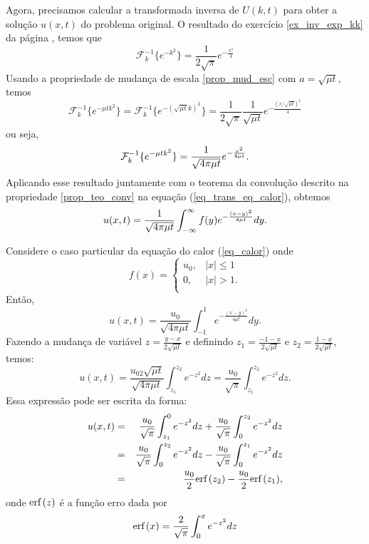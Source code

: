 Agora, precisamos calcular a transformada inversa de $U(k,t)$ para obter a solução $u(x,t)$ do problema original. O resultado do exercício \ref{ex_inv_exp_kk} da página \pageref{ex_inv_exp_kk}, temos que
\begin{equation}
\mathcal{F}^{-1}_k\{e^{-k^2}\}=\frac{1}{2\sqrt{\pi}} e^{-\frac{x^2}{4}}
\end{equation}
Usando a propriedade de mudança de escala \ref{prop_mud_esc} com $a=\sqrt{\mu t}$, temos
\begin{equation}
\mathcal{F}_k^{-1}\{e^{-\mu t k^2}\}=\mathcal{F}_k^{-1}\{e^{-(\sqrt{\mu t} k)^2}\}=\frac{1}{2\sqrt{\pi}}\frac{1}{\sqrt{\mu t}} e^{-\frac{\left(x/\sqrt{\mu t}\right)^2}{4}}
\end{equation}
ou seja,
\begin{equation}{\label{eq_calor_02}}
\mathcal{F}_k^{-1}\{e^{-\mu t k^2}\}=\frac{1}{\sqrt{4\pi\mu t}} e^{-\frac{x^2}{4\mu t}}.
\end{equation}
Aplicando esse resultado juntamente com o teorema da convolução descrito na propriedade \ref{prop_teo_conv} na equação (\ref{eq_trans_eq_calor}), obtemos
\begin{equation}{\label{eq_dif_calor}}
u(x,t)=\frac{1}{\sqrt{4\pi \mu t}}\int_{-\infty}^\infty
f(y)e^{-\frac{(x-y)^2}{4\mu t}}dy.
\end{equation}
\begin{ex}Considere o caso particular da equação do calor (\ref{eq_calor}) onde
\begin{equation}
f(x)=\left\{\begin{array}{ll}
u_0,& |x|\leq 1\\
0,& |x|>1.\\
\end{array}\right.
\end{equation}
Então,
\begin{equation*}
u(x,t)=\frac{u_0}{\sqrt{4\pi \mu t}}\int_{-1}^1
e^{-\frac{(x-y)^2}{4\mu t}}dy.
\end{equation*}
Fazendo a mudança de variável $z=\frac{y-x}{2\sqrt{\mu t}}$ e definindo $z_1=\frac{-1-x}{2\sqrt{\mu t}}$ e $z_2=\frac{1-x}{2\sqrt{\mu t}}$, temos:
\begin{equation*}
u(x,t)=\frac{u_02\sqrt{\mu t}}{\sqrt{4\pi \mu t}}\int_{z_1}^{z_2}
e^{-z^2}dz=\frac{u_0}{\sqrt{\pi }}\int_{z_1}^{z_2}
e^{-z^2}dz.
\end{equation*}
Essa expressão pode ser escrita da forma:
\begin{eqnarray*}
u(x,t)&=&\frac{u_0}{\sqrt{\pi }}\int_{z_1}^{0}
e^{-z^2}dz+\frac{u_0}{\sqrt{\pi }}\int_{0}^{z_2}
e^{-z^2}dz\\
&=&\frac{u_0}{\sqrt{\pi }}\int_{0}^{z_2}
e^{-z^2}dz-\frac{u_0}{\sqrt{\pi }}\int_{0}^{z_1}
e^{-z^2}dz\\
&=&\frac{u_0}{2}\hbox{erf}\ \!(z_2)-\frac{u_0}{2}\hbox{erf}\ \!(z_1),
\end{eqnarray*}
onde $\hbox{erf}\ \!(z)$ é a função erro dada por
\begin{equation}
\hbox{erf}\ \!(x)=\frac{2}{\sqrt{\pi }}\int_{0}^{x}
e^{-z^2}dz
\end{equation}
\end{ex}

